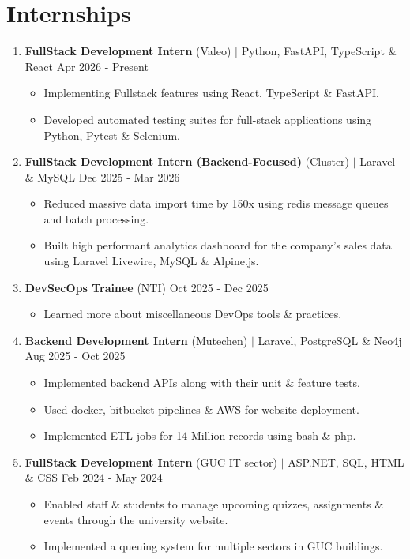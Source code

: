 \documentclass[a4paper,11pt]{article}
\begin{document}
\section{\textbf{Internships}}
\begin{enumerate}
    \item \textbf{FullStack Development Intern} (Valeo) $|$ {Python, FastAPI, TypeScript \& React} \hfill {Apr 2026 - Present}
    \begin{itemize}
    \item Implementing Fullstack features using React, TypeScript \& FastAPI.
    \item Developed automated testing suites for full-stack applications using Python, Pytest \& Selenium.
    \end{itemize}

    \item \textbf{FullStack Development Intern (Backend-Focused)} (Cluster) $|$ {Laravel \& MySQL} \hfill {Dec 2025 - Mar 2026}
    \begin{itemize}
    \item Reduced massive data import time by 150x using redis message queues and batch processing.
    \item Built high performant analytics dashboard for the company’s sales data using Laravel Livewire, MySQL \& Alpine.js.
    \end{itemize}

    \item \textbf{DevSecOps Trainee} (NTI) \hfill {Oct 2025 - Dec 2025}
    \begin{itemize}
        \item Learned more about miscellaneous DevOps tools \& practices.
    \end{itemize}
    \item \textbf{Backend Development Intern} (Mutechen) $|$ {Laravel, PostgreSQL \& Neo4j}  \hfill {Aug 2025 - Oct 2025}
    \begin{itemize}
        \item Implemented backend APIs along with their unit \& feature tests.
        \item Used docker, bitbucket pipelines \& AWS for website deployment.
        \item Implemented ETL jobs for 14 Million records using bash \& php.
    \end{itemize}
     

    \item \textbf{FullStack Development Intern} (GUC IT sector) $|$ {ASP.NET, SQL, HTML \& CSS}  \hfill {Feb 2024 - May 2024}
    \begin{itemize} 
        \item Enabled staff \& students to manage upcoming quizzes, assignments \& events through the university website.
        \item Implemented a queuing system for multiple sectors in GUC buildings.
    \end{itemize}

\end{enumerate}
\end{document}
